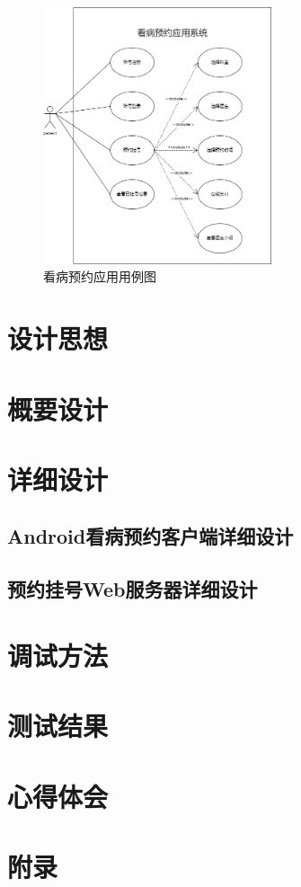 \documentclass[UTF8,12pt]{article}
\begin{document}
\begin{figure}[htbp]
    \centering
    \includegraphics[width=0.6\textwidth]{imgs/1.png}
    \caption{看病预约应用用例图}
\end{figure}



\newpage

\section{设计思想}

\newpage

\section{概要设计}

\newpage

\section{详细设计}

\newpage

\subsection{Android看病预约客户端详细设计}

\newpage

\subsection{预约挂号Web服务器详细设计}

\newpage

\section{调试方法}

\newpage

\section{测试结果}

\newpage

\section{心得体会}

\newpage

\section{附录}

\newpage
\end{document}
